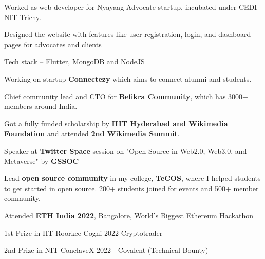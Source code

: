 \documentclass[]{deedy-resume-openfont}
\begin{document}
\begin{minipage}[t]{0.69\textwidth}
\hfill {}
\begin{tightemize}
    \item Worked as web developer for Nyayaag Advocate startup, incubated under CEDI NIT Trichy.
    \item Designed the website with features like user registration, login, and dashboard pages for advocates and clients
    \item Tech stack – Flutter, MongoDB and NodeJS
\end{tightemize}

\sectionsep


\begin{tightemize}
    \item Working on startup \textbf{Connectezy} which aims to connect alumni and students.
\end{tightemize}

\begin{tightemize}
    \item Chief community lead and CTO for \textbf{Befikra Community}, which has 3000+ members around India.
\end{tightemize}

\begin{tightemize}
    \item Got a fully funded scholarship by \textbf{IIIT Hyderabad and Wikimedia Foundation} and attended \textbf{2nd Wikimedia Summit}.
\end{tightemize}

\begin{tightemize}
    \item Speaker at \textbf{Twitter Space} session on "Open Source in Web2.0, Web3.0, and Metaverse" by \textbf{GSSOC}
\end{tightemize}

\begin{tightemize}
    \item Lead \textbf{open source community} in my college, \textbf{TeCOS}, where I helped students to get started in open source. 200+ students joined for events and 500+ member community.
\end{tightemize}

\begin{tightemize}
    \item Attended \textbf{ETH India 2022}, Bangalore, World’s Biggest Ethereum Hackathon 
\end{tightemize}

\begin{tightemize}
    \item 1st Prize in IIT Roorkee Cogni 2022 Cryptotrader
\end{tightemize}

\begin{tightemize}
    \item 2nd Prize in NIT ConclaveX 2022 - Covalent (Technical Bounty)
\end{tightemize}

\sectionsep
\end{minipage} 
\end{document}
